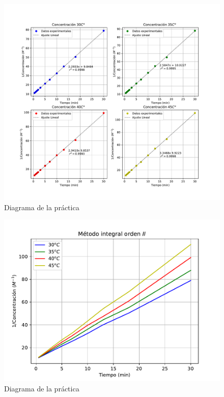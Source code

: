 \begin{figure}[H]
    \centering
    \includegraphics[scale=0.65]{Figuras/Ctodos.pdf}
    \caption{Diagrama de la pr\'{a}ctica}
\end{figure}

\begin{figure}[H]
    \centering
    \includegraphics[scale=1]{Figuras/concentracion_todos.pdf}
    \caption{Diagrama de la pr\'{a}ctica}
\end{figure}


